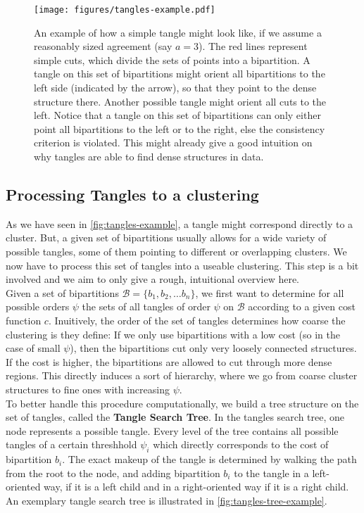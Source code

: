 \begin{figure}[h]
    \centering
    \texttt{[image: figures/tangles-example.pdf]}
    \caption{An example of how a simple tangle might look like, if we assume a reasonably sized agreement (say $a = 3$). The red lines represent simple cuts, which divide the sets of points into a bipartition.
    A tangle on this set of bipartitions might orient all bipartitions to the left side (indicated by the arrow), so that they point to the dense structure there. Another 
possible tangle might orient all cuts to the left. Notice that a tangle on this set of bipartitions can only either point all bipartitions to the left or to the right, else
the consistency criterion is violated. This might already give a good intuition on why tangles are able to find dense structures in data.}
    \label{fig:tangles-example}
\end{figure}
\FloatBarrier

\subsection{Processing Tangles to a clustering}
As we have seen in \autoref{fig:tangles-example}, a tangle might correspond directly to a cluster. But, a given set of bipartitions usually allows for a wide 
variety of possible tangles, some of them pointing to different or overlapping clusters. We now have to process this set of tangles into a useable clustering.
This step is a bit involved and we aim to only give a rough, intuitional overview here. \\

Given a set of bipartitions $\mathcal{B} = \{b_1, b_2, \ldots b_n\} $, we first want to determine for all possible orders $\psi$ the sets of all tangles of order $\psi$ on $\mathcal{B}$ 
according to a given cost function $c$. Inuitively, the order of the set of tangles determines how coarse the clustering is they define:
If we only use bipartitions with a low cost (so in the case of small $\psi$), then the bipartitions cut only very loosely connected structures. 
If the cost is higher, the bipartitions are allowed to cut through more dense regions. This directly induces a sort of hierarchy, where we go from coarse cluster
structures to fine ones with increasing $\psi$. \\
To better handle this procedure computationally, we build a tree structure on the set of tangles, called the \textbf{Tangle Search Tree}. In the tangles search tree, 
one node represents a possible tangle. Every level of the tree contains all possible tangles of a certain threshhold $\psi_i$ which directly corresponds to the cost of bipartition $b_i$. 
The exact makeup of the tangle is determined by walking the path from the root to the node, and adding bipartition $b_i$ to the tangle in a left-oriented way, if it is a left child and
in a right-oriented way if it is a right child. An exemplary tangle search tree is illustrated in \autoref{fig:tangles-tree-example}.

